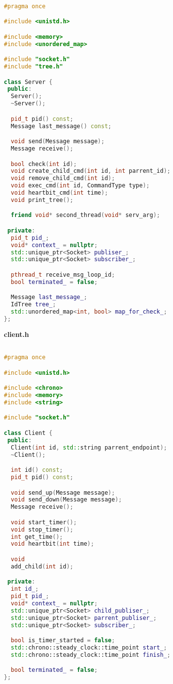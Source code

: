 \begin{lstlisting}[language=C++]

#pragma once

#include <unistd.h>

#include <memory>
#include <unordered_map>

#include "socket.h"
#include "tree.h"

class Server {
 public:
  Server();
  ~Server();

  pid_t pid() const;
  Message last_message() const;

  void send(Message message);
  Message receive();

  bool check(int id);
  void create_child_cmd(int id, int parrent_id);
  void remove_child_cmd(int id);
  void exec_cmd(int id, CommandType type);
  void heartbit_cmd(int time);
  void print_tree();

  friend void* second_thread(void* serv_arg);

 private:
  pid_t pid_;
  void* context_ = nullptr;
  std::unique_ptr<Socket> publiser_;
  std::unique_ptr<Socket> subscriber_;

  pthread_t receive_msg_loop_id;
  bool terminated_ = false;

  Message last_message_;
  IdTree tree_;
  std::unordered_map<int, bool> map_for_check_;
};

\end{lstlisting}

\textbf{client.h}

\begin{lstlisting}[language=C++]

#pragma once

#include <unistd.h>

#include <chrono>
#include <memory>
#include <string>

#include "socket.h"

class Client {
 public:
  Client(int id, std::string parrent_endpoint);
  ~Client();

  int id() const;
  pid_t pid() const;

  void send_up(Message message);
  void send_down(Message message);
  Message receive();

  void start_timer();
  void stop_timer();
  int get_time();
  void heartbit(int time);

  void
  add_child(int id);

 private:
  int id_;
  pid_t pid_;
  void* context_ = nullptr;
  std::unique_ptr<Socket> child_publiser_;
  std::unique_ptr<Socket> parrent_publiser_;
  std::unique_ptr<Socket> subscriber_;

  bool is_timer_started = false;
  std::chrono::steady_clock::time_point start_;
  std::chrono::steady_clock::time_point finish_;

  bool terminated_ = false;
};

\end{lstlisting}

